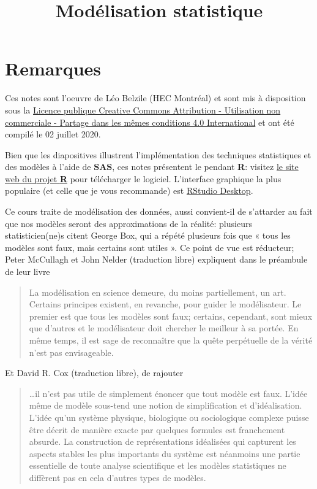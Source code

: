 \documentclass[
  11pt,
  letterpaper,
]{book}
\title{Modélisation statistique}
\author{}
\date{\vspace{-2.5em}}
\let\oldhref\href
\renewcommand{\href}[2]{#2\footnote{\url{#1}}}
\begin{document}
\maketitle

\let\href\oldhref

{
\setcounter{tocdepth}{1}
\tableofcontents
}
\hypertarget{remarques}{%
\chapter*{Remarques}\label{remarques}}

Ces notes sont l'oeuvre de Léo Belzile (HEC Montréal) et sont mis à disposition sous la \href{https://creativecommons.org/licenses/by-nc-sa/4.0/legalcode.fr}{Licence publique Creative Commons Attribution - Utilisation non commerciale - Partage dans les mêmes conditions 4.0 International} et ont été compilé le 02 juillet 2020.

Bien que les diapositives illustrent l'implémentation des techniques statistiques et des modèles à l'aide de \textbf{SAS}, ces notes présentent le pendant \textbf{R}: visitez \href{https://cran.r-project.org/}{le site web du projet \textbf{R}} pour télécharger le logiciel. L'interface graphique la plus populaire (et celle que je vous recommande) est \href{https://www.rstudio.com/products/rstudio/download/}{RStudio Desktop}.

Ce cours traite de modélisation des données, aussi convient-il de s'attarder au fait que nos modèles seront des approximations de la réalité: plusieurs statisticien(ne)s citent George Box, qui a répété plusieurs fois que « tous les modèles sont faux, mais certains sont utiles ». Ce point de vue est réducteur; Peter McCullagh et John Nelder (traduction libre) expliquent dans le préambule de leur livre

\begin{quote}
La modélisation en science demeure, du moins partiellement, un art. Certains principes existent, en revanche, pour guider le modélisateur. Le premier est que tous les modèles sont faux; certains, cependant, sont mieux que d'autres et le modélisateur doit chercher le meilleur à sa portée. En même temps, il est sage de reconnaître que la quête perpétuelle de la vérité n'est pas envisageable.
\end{quote}

Et David R. Cox (traduction libre), de rajouter

\begin{quote}
\ldots il n'est pas utile de simplement énoncer que tout modèle est faux. L'idée même de modèle sous-tend une notion de simplification et d'idéalisation. L'idée qu'un système physique, biologique ou sociologique complexe puisse être décrit de manière exacte par quelques formules est franchement absurde. La construction de représentations idéalisées qui capturent les aspects stables les plus importants du système est néanmoins une partie essentielle de toute analyse scientifique et les modèles statistiques ne diffèrent pas en cela d'autres types de modèles.
\end{quote}
\end{document}
